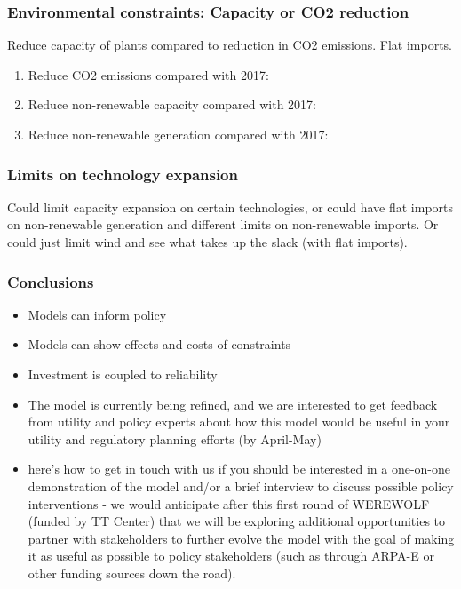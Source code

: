 \documentclass[xcolor=dvipsnames]{beamer}
\begin{document}
\begin{frame}
  \frametitle{Environmental constraints: Capacity or CO2 reduction}

Reduce capacity of plants compared to reduction in CO2 emissions. Flat imports.
\begin{enumerate}
\item Reduce \alert{CO2 emissions} compared with 2017:
\item Reduce \alert{non-renewable capacity} compared with 2017:
\item Reduce \alert{non-renewable generation} compared with 2017:
\end{enumerate}

\end{frame}

\begin{frame}
  \frametitle{Limits on technology expansion}

Could limit capacity expansion on certain technologies, or could have flat imports on non-renewable generation and different limits on non-renewable imports.   Or could just limit wind and see what takes up the slack (with flat imports).
\end{frame}

\begin{frame}
  \frametitle{Conclusions}
  \begin{itemize}
  \item Models can inform policy
  \item Models can show effects and costs of constraints
  \item Investment is coupled to reliability
      \item The model is currently being refined, and we are interested to get feedback from utility and policy experts about how this model would be useful in your utility and regulatory planning efforts (by April-May)
  \item  here's how to get in touch with us if you should be interested in a one-on-one demonstration of the model and/or a brief interview to discuss possible policy interventions - we would anticipate after this first round of WEREWOLF (funded by TT Center) that we will be exploring additional opportunities to partner with stakeholders to further evolve the model with the goal of making it as useful as possible to policy stakeholders (such as through ARPA-E or other funding sources down the road).
  \end{itemize}
\end{frame}
\end{document}
